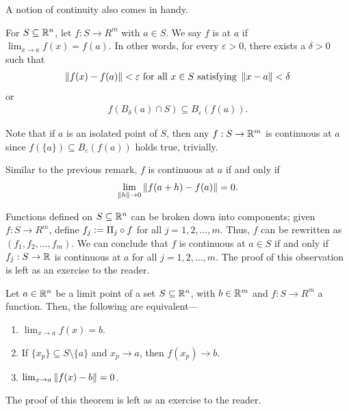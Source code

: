 A notion of continuity also comes in handy.
\begin{definition}
    For $S \subseteq \mathbb{R}^{n}$, let $f:S \to R^{m}$ with $a \in S$. We say $f$ is  at $a$ if $\lim_{x \to a} f(x) = f(a)$. In other words, for every $\varepsilon > 0$, there exists a $\delta > 0$ such that
    \begin{align}
        \left\lVert f(x)-f(a)\right\rVert < \varepsilon \text{ for all } x  \in S \text{ satisfying } \left\lVert x-a\right\rVert < \delta
    \end{align}
    or
    \begin{align}
        f(B_{\delta}(a) \cap S) \subseteq B_{\varepsilon}(f(a)).
    \end{align}
\end{definition}
Note that if $a$ is an isolated point of $S$, then any $f:S \to \mathbb{R}^{m}$ is continuous at $a$ since $f(\{a\}) \subseteq B_{\varepsilon}(f(a))$ holds true, trivially.

\begin{remark}
    Similar to the previous remark, $f$ is continuous at $a$ if and only if
    \begin{align}
        \lim_{\left\lVert h\right\rVert \to 0} \left\lVert f(a+h)-f(a)\right\rVert = 0.
    \end{align}
\end{remark}

Functions defined on $S \subseteq \mathbb{R}^{n}$ can be broken down into components; given $f :S \to R^{m}$, define $f_{j} \vcentcolon= \Pi_{j} \circ f$ for all $j = 1,2,\ldots,m$. Thus, $f$ can be rewritten as $(f_{1},f_{2},\ldots,f_{m})$. We can conclude that $f$ is continuous at $a \in S$ if and only if $f_{j}:S \to \mathbb{R}$ is continuous at $a$ for all $j = 1,2,\ldots,m$. The proof of this observation is left as an exercise to the reader.

\begin{theorem}
    Let $a \in \mathbb{R}^{n}$ be a limit point of a set $S \subseteq \mathbb{R}^{n}$, with $b \in \mathbb{R}^{m}$ and $f:S \to R^{m}$ a function. Then, the following are equivalent---
    \begin{enumerate}
        \item $\lim_{x \to a}f(x) = b$.
        \item If $\{x_{p}\} \subseteq S\setminus\{a\}$ and $x_{p} \to a$, then $f(x_{p}) \to b$.
        \item $\lim_{x \to a} \left\lVert f(x)-b\right\rVert = 0$.
    \end{enumerate}
\end{theorem}
The proof of this theorem is left as an exercise to the reader.

